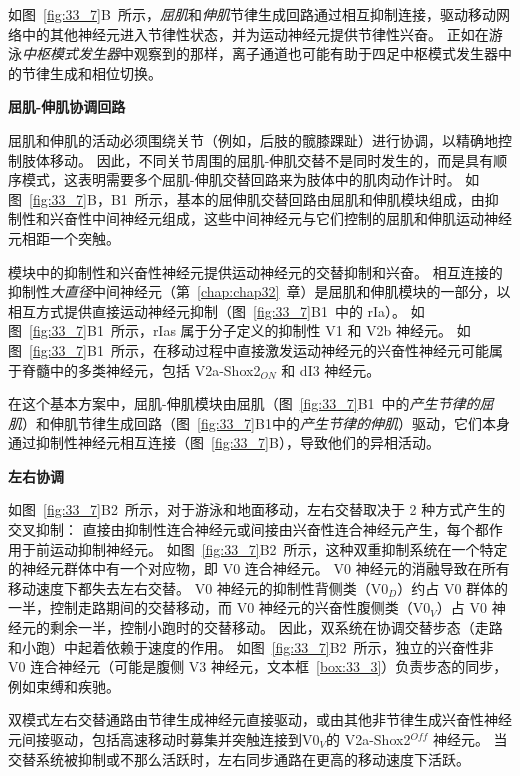 如图~\ref{fig:33_7}B~所示，\textit{屈肌}和\textit{伸肌}节律生成回路通过相互抑制连接，驱动移动网络中的其他神经元进入节律性状态，并为运动神经元提供节律性兴奋。
正如在游泳\textit{中枢模式发生器}中观察到的那样，离子通道也可能有助于四足中枢模式发生器中的节律生成和相位切换。


\textbf{屈肌-伸肌协调回路}

屈肌和伸肌的活动必须围绕关节（例如，后肢的髋膝踝趾）进行协调，以精确地控制肢体移动。
因此，不同关节周围的屈肌-伸肌交替不是同时发生的，而是具有顺序模式，这表明需要多个屈肌-伸肌交替回路来为肢体中的肌肉动作计时。
如图~\ref{fig:33_7}B，B1~所示，基本的屈伸肌交替回路由屈肌和伸肌模块组成，由抑制性和兴奋性中间神经元组成，这些中间神经元与它们控制的屈肌和伸肌运动神经元相距一个突触。


模块中的抑制性和兴奋性神经元提供运动神经元的交替抑制和兴奋。
相互连接的抑制性\textit{大直径}中间神经元（第~\ref{chap:chap32}~章）是屈肌和伸肌模块的一部分，以相互方式提供直接运动神经元抑制（图~\ref{fig:33_7}B1~中的 rIa）。
如图~\ref{fig:33_7}B1~所示，rIas 属于分子定义的抑制性 V1 和 V2b 神经元。
如图~\ref{fig:33_7}B1~所示，在移动过程中直接激发运动神经元的兴奋性神经元可能属于脊髓中的多类神经元，包括 V2a-Shox2$_{ON}$ 和 dI3 神经元。


在这个基本方案中，屈肌-伸肌模块由屈肌（图~\ref{fig:33_7}B1~中的\textit{产生节律的屈肌}）和伸肌节律生成回路（图~\ref{fig:33_7}B1中的\textit{产生节律的伸肌}）驱动，它们本身通过抑制性神经元相互连接（图~\ref{fig:33_7}B），导致他们的异相活动。


\textbf{左右协调}

如图~\ref{fig:33_7}B2~所示，对于游泳和地面移动，左右交替取决于 2 种方式产生的交叉抑制：
直接由抑制性连合神经元或间接由兴奋性连合神经元产生，每个都作用于前运动抑制神经元。
如图~\ref{fig:33_7}B2~所示，这种双重抑制系统在一个特定的神经元群体中有一个对应物，即 V0 连合神经元。
V0 神经元的消融导致在所有移动速度下都失去左右交替。
V0 神经元的抑制性背侧类（V0$_D$）约占 V0 群体的一半，控制走路期间的交替移动，而 V0 神经元的兴奋性腹侧类（V0$_V$）占 V0 神经元的剩余一半，控制小跑时的交替移动。
因此，双系统在协调交替步态（走路和小跑）中起着依赖于速度的作用。
如图~\ref{fig:33_7}B2~所示，独立的兴奋性非 V0 连合神经元（可能是腹侧 V3 神经元，文本框~\ref{box:33_3}）负责步态的同步，例如束缚和疾驰。


双模式左右交替通路由节律生成神经元直接驱动，或由其他非节律生成兴奋性神经元间接驱动，包括高速移动时募集并突触连接到V0$_V$的 V2a-Shox2$^{Off}$ 神经元。
当交替系统被抑制或不那么活跃时，左右同步通路在更高的移动速度下活跃。


